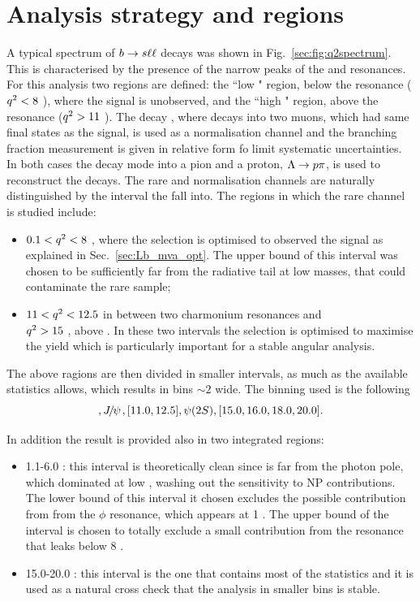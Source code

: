 \section{Analysis strategy and \qsq regions}
\label{sec:Lb_q2choice}

A typical \qsq spectrum of $b\rightarrow s\ell\ell$ decays was shown in Fig.~\ref{sec:fig:q2spectrum}.
This is characterised by the presence of the narrow peaks of the \jpsi and \psitwos resonances.
For this analysis two regions are defined: the ``low \qsq" region, below the \jpsi resonance ($q^2 < 8$ \gevgevcccc),
where the signal is unobserved, and the ``high \qsq" region, above the \jpsi resonance ($q^2 > 11$ \gevgevcccc).
The decay \Lb\to\jpsi\Lz, where \jpsi decays into two muons, which had same final states as the signal,
is used as a normalisation channel and the branching fraction measurement is given in relative form
fo limit systematic uncertainties. In both cases the \Lz decay mode into a pion and a proton, $\Lz\to p\pi$,
is used to reconstruct the decays. The rare and normalisation channels are naturally distinguished
by the \qsq interval the fall into. The regions in which the rare channel is studied include:
\begin{itemize}
\item $0.1 < q^2 < 8$ \gevgevcccc, where the selection is optimised to observed the signal as explained in Sec.~\ref{sec:Lb_mva_opt}.
The upper bound of this interval was chosen to be sufficiently far from the \jpsi radiative tail at low masses, that
could contaminate the rare sample;
\item  $11 < q^2 < 12.5$ \gevgevcccc in between two charmonium resonances and \\$q^2>15$ \gevgevcccc, above \psitwos.
In these two intervals the selection is optimised to maximise the yield which is particularly important
for a stable angular analysis.
\end{itemize}
The above ragions are then divided in smaller intervals, as much as the available statistics allows, which results
in bins $\sim 2$ \gevgevcccc wide. The binning used is the following 
\begin{equation}
[0.1, 2.0, 4.0, 6.0, 8.0], \jpsi, [11.0, 12.5], \psitwos, [15.0, 16.0, 18.0, 20.0].
\end{equation}

In addition the result is provided also in two integrated regions:
\begin{itemize}
\item 1.1-6.0 \gevgevcccc: this interval is theoretically clean since is far from the
photon pole, which dominated at low \qsq, washing out the sensitivity to NP contributions.
The lower bound of this interval it chosen excludes the possible contribution from
from the $\phi$ resonance, which appears at 1 \gevgevcccc. The upper bound of the interval
is chosen to totally exclude a small contribution from the \jpsi resonance that leaks
below 8 \gevgevcccc.
\item 15.0-20.0 \gevgevcccc: this interval is the one that contains most of the
statistics and it is used as a natural cross check that the analysis in smaller bins is stable.
\end{itemize}

